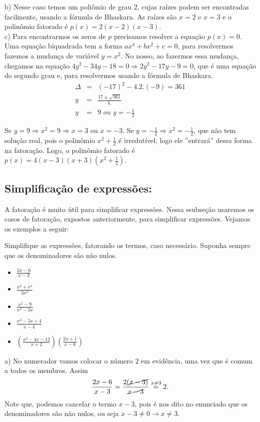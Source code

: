 \begin{enumerate}
b) Nesse caso temos um poliômio de grau $2$, cujas raízes podem ser encontradas facilmente, usando a fórmula de Bhaskara. As raízes são $x=2$ e $x=3$ e o polinômio fatorado é $p(x)=2(x-2)(x-3)$. \\

c) Para encontrarmos os zeros de $p$ precisamos resolver a equação $p(x)=0$. Uma equação biquadrada tem a forma $ax^4+bx^2+c=0$, para resolvermos fazemos a mudança de variável $y=x^2$. No nosso, ao fazermos essa mudança, chegamos na equação $4y^2-34y-18=0 \Rightarrow 2y^2-17y-9=0$, que é uma equação do segundo grau e, para resolvermos usando  a fórmula de Bhaskara.
\begin{eqnarray}
\Delta &=& (-17)^2-4.2.(-9)=361 \\
y&=& \frac{17 \pm \sqrt{361}}{4,
} \\
y& =&9 \,\, ou \,\, y=-\frac{1}{2}
\end{eqnarray}

Se $y=9 \Rightarrow x^2=9 \Rightarrow x=3$ ou $x=-3$. Se $y=-\frac{1}{2} \Rightarrow x^2=-\frac{1}{2}$, que não tem solução real, pois o polinômio $x^2+\frac{1}{2}$ é irredutível, logo ele ''entrará'' dessa forma na fatoração. Logo, o polinômio fatorado é $p(x)= 4(x-3)(x+3)(x^2+\frac{1}{2})$.
\color{black}
\end{enumerate}
\subsection{Simplificação de expressões:}
A fatoração é muito útil para simplificar expressões. Nessa ssubseção usaremos os casos de fatoração, expostos anteriormente, para simplificar expressões. Vejamos os exemplos a seguir:

\begin{exe}Simplifique as expressões, fatorando os termos, caso necessário. Suponha sempre que os denominadores são não nulos.

\begin{minipage}[t]{.44\textwidth}
\begin{itemize}
\item[a)] $ \frac{2x-6}{x-3}$
\item[b)] $\frac{x^2+x^4}{3x^3}$
\end{itemize}
\end{minipage}
\begin{minipage}[t]{.44\textwidth}
\begin{itemize}
\item[c)] $\frac{x^2-9}{x^2-3x}$
\item[e)]$\frac{x^2-5x+4}{x-4}$
\item[f)]  $\left(\frac{x^2-4x-12}{x+2} \right) \left( \frac{2x+1}{x-6}\right)$
\end{itemize}
\end{minipage}
\end{exe}
\color{red}
a) No numerador vamos colocar o número $2$ em evidência, uma vez que é comum a todos os membros. Assim
$$\frac{2x-6}{x-3}= \frac{2\cancel{(x-3)}}{\cancel{x-3}} \stackrel{x \neq 3}{=}2.$$
Note que, podemos cancelar o termo $x-3$, pois é nos dito no enunciado que os denominadores são não nulos, ou seja $x-3 \neq 0 \to x \neq 3$. \\

